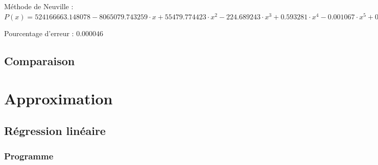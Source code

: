 \documentclass{report}
\begin{document}
		Méthode de Neuville : $P(x)= 524166663.148078-8065079.743259 \cdot x + 55479.774423 \cdot x^{2} - 224.689243 \cdot x^{3}  + 0.593281 \cdot x^{4} - 0.001067 \cdot x^{5}  + 0.000001 \cdot x^{6} - 0.000000 \cdot x^{7}  + 0.000000 \cdot x^{8} - 0.000000 \cdot x^{9}  + 0.000000 \cdot x^{10} $
		
		Pourcentage d'erreur : $0.000046$
      \renewcommand{\arraystretch}{2}
      \renewcommand{\arraystretch}{1}
    \section{Comparaison}
  \chapter{Approximation}
    \section{Régression linéaire}
      \subsection{Programme}
	
    \newpage
\end{document}
